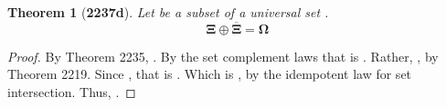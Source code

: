 \documentclass[preview]{standalone}
\newtheorem*{theorem*}{Theorem}
\begin{document}
\begin{theorem*}[\textbf{2237d}] \color{black}
    Let \bm{$\Xi$} be a subset of a universal set \bm{$\Omega$}. 
    \begin{equation*}
        \bm{\Xi \oplus \overline{\Xi} = \Omega}
    \end{equation*}
\end{theorem*}
\begin{proof} \color{black}
    By Theorem 2235, 
    \bm{$
    \Xi \oplus \overline{\Xi} 
        = 
    \big \langle \Xi \cup \overline{\Xi} \big \rangle
        - 
    \big \langle \Xi \cap \overline{\Xi} \big \rangle
    $}. 
    By the set complement laws that is \bm{$\Omega - \varnothing$}. 
    Rather, \bm{$\Omega \cap \overline{\bm{\varnothing}}$}, 
    by Theorem 2219. 
    Since \bm{$\overline{\bm{\varnothing}} = \Omega$}, that is 
    \bm{$\Omega \cap \Omega$}. Which is \bm{$\Omega$}, 
    by the idempotent law for set intersection.
    Thus, \bm{$\Xi \oplus \overline{\Xi} = \Omega$}.
\color{lightgray} \end{proof}
\end{document}
